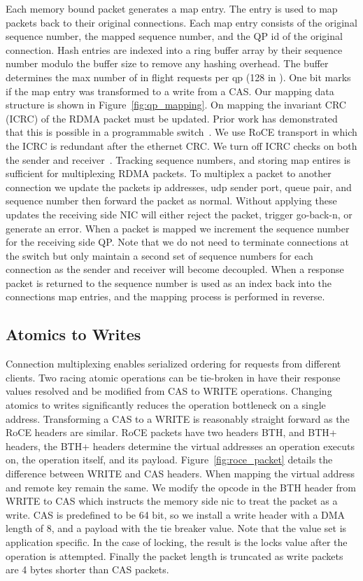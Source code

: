 Each memory bound packet generates a map entry. The entry is
used to map packets back to their original connections. Each
map entry consists of the original sequence number, the
mapped sequence number, and the QP id of the original
connection. Hash entries are indexed into a ring buffer
array by their sequence number modulo the buffer size to
remove any hashing overhead. The buffer determines the max
number of in flight requests per qp (128 in \sword). One bit
marks if the map entry was transformed to a write from a
CAS. Our mapping data structure is shown in
Figure~\ref{fig:qp_mapping}.
On mapping the invariant CRC (ICRC) of the RDMA packet must
be updated. Prior work has demonstrated that this is
possible in a programmable switch~. We use RoCE
transport in which the ICRC is redundant after the ethernet
CRC. We turn off ICRC checks on both the sender and
receiver~\cite{switchml}.
Tracking sequence numbers, and storing map entires is
sufficient for multiplexing RDMA packets.  To multiplex a
packet to another connection we update the packets ip
addresses, udp sender port, queue pair, and sequence number
then forward the packet as normal. Without applying these
updates the receiving side NIC will either reject the
packet, trigger go-back-n, or generate an error. 
When a packet is mapped we increment the sequence number for
the receiving side QP.  Note that we do not need to
terminate connections at the switch but only maintain a
second set of sequence numbers for each connection as the
sender and receiver will become decoupled. When a response
packet is returned to {\sword} the sequence number is used
as an index back into the connections map entries, and the
mapping process is performed in reverse.

\subsection{Atomics to Writes}

Connection multiplexing enables serialized ordering for
requests from different clients. Two racing atomic
operations can be tie-broken in {\sword} have their response
values resolved and be modified from CAS to WRITE
operations. Changing atomics to writes significantly reduces
the operation bottleneck on a single address. 
Transforming a CAS to a WRITE is reasonably straight forward
as the RoCE headers are similar. RoCE packets have two
headers BTH, and BTH+ headers, the BTH+ headers determine
the virtual addresses an operation executs on, the operation
itself, and its payload. Figure~\ref{fig:roce_packet}
details the difference between WRITE and CAS headers. When
mapping the virtual address and remote key remain the same.
We modify the opcode in the BTH header from WRITE to CAS
which instructs the memory side nic to treat the packet as a
write.  CAS is predefined to be 64 bit, so we install a
write header with a DMA length of 8, and a payload with the
tie breaker value. Note that the value set is application
specific. In the case of locking, the result is the locks
value after the operation is attempted. Finally the packet
length is truncated as write packets are 4 bytes shorter
than CAS packets.

